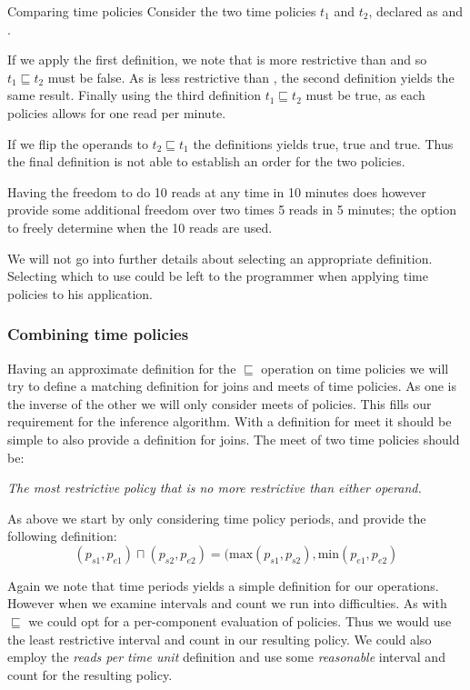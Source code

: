 \begin{example}{Comparing time policies}
  Consider the two time policies $t_1$ and $t_2$, declared as  and .

  If we apply the first definition, we note that  is more restrictive than  and so $t_1 \sqsubseteq t_2$ must be false.
  As  is less restrictive than , the second definition yields the same result.
  Finally using the third definition $t_1 \sqsubseteq t_2$ must be true, as each policies allows for one read per minute.

  If we flip the operands to $t_2 \sqsubseteq t_1$ the definitions yields true, true and true.
  Thus the final definition is not able to establish an order for the two policies.

  Having the freedom to do 10 reads at any time in 10 minutes does however provide some additional freedom over two times 5 reads in 5 minutes; the option to freely determine when the 10 reads are used.
\end{example}

We will not go into further details about selecting an appropriate definition.
Selecting which to use could be left to the programmer when applying time policies to his application.

\subsubsection{Combining time policies}
Having an approximate definition for the $\sqsubseteq$ operation on time policies we will try to define a matching definition for joins and meets of time policies.
As one is the inverse of the other we will only consider meets of policies.
This fills our requirement for the inference algorithm.
With a definition for meet it should be simple to also provide a definition for joins.
The meet of two time policies should be:
\begin{center}
  \textit{The most restrictive policy that is no more restrictive than either operand.}
\end{center}

As above we start by only considering time policy periods, and provide the following definition:
$$(p_{s1}, p_{e1}) \sqcap (p_{s2}, p_{e2}) = (\text{max}(p_{s1}, p_{s2}), \text{min}(p_{e1}, p_{e2})$$

Again we note that time periods yields a simple definition for our operations.
However when we examine intervals and count we run into difficulties.
As with $\sqsubseteq$ we could opt for a per-component evaluation of policies.
Thus we would use the least restrictive interval and count in our resulting policy.
We could also employ the \textit{reads per time unit} definition and use some \textit{reasonable} interval and count for the resulting policy.

